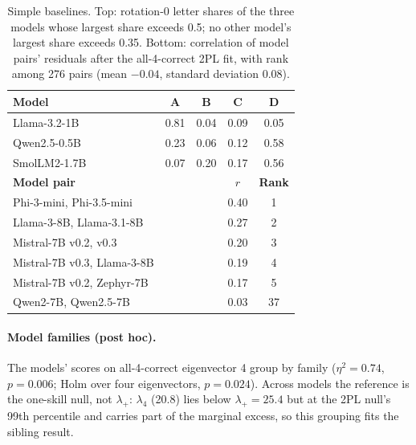 \documentclass{article}
\theoremstyle{plain}
\theoremstyle{remark}
\begin{document}
\begin{table}[t]
\caption{Simple baselines. Top: rotation-0 letter shares of the three
models whose largest share exceeds 0.5; no other model's largest share exceeds 0.35. Bottom:
correlation of model pairs' residuals after the all-4-correct 2PL fit,
with rank among 276 pairs (mean $-0.04$, standard deviation 0.08).}
\label{tab:baselines}
\vskip 0.06in
\centering
\begin{small}
\setlength{\tabcolsep}{4pt}
\begin{tabular}{@{}lcccc@{}}
\toprule
\textbf{Model} & A & B & C & D \\
\midrule
Llama-3.2-1B & 0.81 & 0.04 & 0.09 & 0.05 \\
Qwen2.5-0.5B & 0.23 & 0.06 & 0.12 & 0.58 \\
SmolLM2-1.7B & 0.07 & 0.20 & 0.17 & 0.56 \\
\midrule
\textbf{Model pair} & & & $r$ & \textbf{Rank} \\
\midrule
Phi-3-mini, Phi-3.5-mini & & & 0.40 & 1 \\
Llama-3-8B, Llama-3.1-8B & & & 0.27 & 2 \\
Mistral-7B v0.2, v0.3 & & & 0.20 & 3 \\
Mistral-7B v0.3, Llama-3-8B & & & 0.19 & 4 \\
Mistral-7B v0.2, Zephyr-7B & & & 0.17 & 5 \\
Qwen2-7B, Qwen2.5-7B & & & 0.03 & 37 \\
\bottomrule
\end{tabular}
\end{small}
\vskip -0.1in
\end{table}

\paragraph{Model families (post hoc).} The models'
scores on all-4-correct eigenvector 4 group by family ($\eta^2=0.74$, $p=0.006$; Holm over four eigenvectors,
$p=0.024$). Across models the reference is the one-skill null, not
$\lambda_+$: $\lambda_4$ (20.8) lies below $\lambda_+=25.4$ but at the
2PL null's 99th percentile and carries part of the marginal excess, so
this grouping fits the sibling result.
\end{document}
